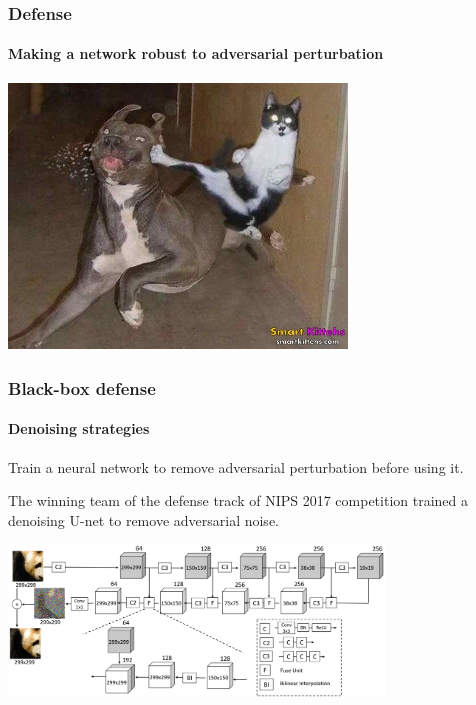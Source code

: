 \documentclass[9pt]{beamer}
\begin{document}
\begin{frame}
  \frametitle{Defense}

  \framesubtitle{Making a network robust to adversarial perturbation}

  \begin{center}
    \includegraphics[width = 9cm]{images/defense.jpg}
  \end{center}
\end{frame}

\begin{frame}
  \frametitle{Black-box defense}

  \framesubtitle{Denoising strategies}

  Train a neural network to remove adversarial perturbation before
  using it.

  \medskip

  The winning team of the defense track of NIPS 2017 competition
  trained a denoising U-net to remove adversarial noise.

  \bigskip

  \begin{center}
    \includegraphics[width = 10cm]{images/dunet.png}
  \end{center}


\end{frame}
\end{document}
